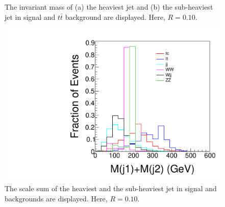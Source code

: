 \documentclass[a4paper,11pt]{article}
\begin{document}
\begin{figure}[htbp]
  \setcounter{subfigure}{0}
  \centering
  \caption{The invariant mass of (a) the heaviest jet and (b) the sub-heaviest jet in signal and $t\bar{t}$ background are displayed. Here, $R=0.10$.}\label{mj1mj2}
\end{figure}

\begin{figure}
  \centering
  \includegraphics[width=.6\linewidth]{mjsum.pdf}
  \caption{The scale sum of the heaviest and the sub-heaviest jet in signal and backgrounds are displayed. Here, $R=0.10$. \label{mjsum}}
\end{figure}
\end{document}

